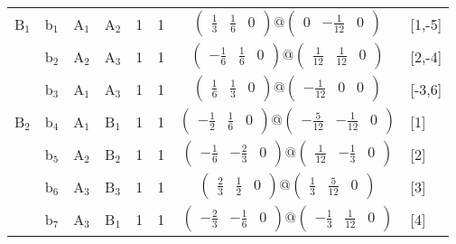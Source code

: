 \documentclass[fleqn,10pt,landscape]{article}
\begin{document}
\begin{itemize}
\begin{center}
\begin{longtable}{cc|cc|c|c|c|l}
B$_{1}$ & b$_{1}$ & A$_{1}$ & A$_{2}$ & 1 & 1 & $\begin{pmatrix} \frac{1}{3} & \frac{1}{6} & 0 \end{pmatrix}@\begin{pmatrix} 0 & - \frac{1}{12} & 0 \end{pmatrix}$ & [1,-5] \\
& b$_{2}$ & A$_{2}$ & A$_{3}$ & 1 & 1 & $\begin{pmatrix} - \frac{1}{6} & \frac{1}{6} & 0 \end{pmatrix}@\begin{pmatrix} \frac{1}{12} & \frac{1}{12} & 0 \end{pmatrix}$ & [2,-4] \\
& b$_{3}$ & A$_{1}$ & A$_{3}$ & 1 & 1 & $\begin{pmatrix} \frac{1}{6} & \frac{1}{3} & 0 \end{pmatrix}@\begin{pmatrix} - \frac{1}{12} & 0 & 0 \end{pmatrix}$ & [-3,6] \\ \hline
B$_{2}$ & b$_{4}$ & A$_{1}$ & B$_{1}$ & 1 & 1 & $\begin{pmatrix} - \frac{1}{2} & \frac{1}{6} & 0 \end{pmatrix}@\begin{pmatrix} - \frac{5}{12} & - \frac{1}{12} & 0 \end{pmatrix}$ & [1] \\
& b$_{5}$ & A$_{2}$ & B$_{2}$ & 1 & 1 & $\begin{pmatrix} - \frac{1}{6} & - \frac{2}{3} & 0 \end{pmatrix}@\begin{pmatrix} \frac{1}{12} & - \frac{1}{3} & 0 \end{pmatrix}$ & [2] \\
& b$_{6}$ & A$_{3}$ & B$_{3}$ & 1 & 1 & $\begin{pmatrix} \frac{2}{3} & \frac{1}{2} & 0 \end{pmatrix}@\begin{pmatrix} \frac{1}{3} & \frac{5}{12} & 0 \end{pmatrix}$ & [3] \\
& b$_{7}$ & A$_{3}$ & B$_{1}$ & 1 & 1 & $\begin{pmatrix} - \frac{2}{3} & - \frac{1}{6} & 0 \end{pmatrix}@\begin{pmatrix} - \frac{1}{3} & \frac{1}{12} & 0 \end{pmatrix}$ & [4] \\

\end{longtable}
\end{center}
\end{itemize}
\end{document}
